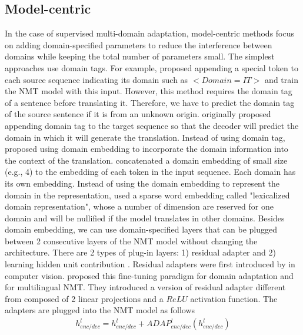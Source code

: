 \subsection{Model-centric}
In the case of supervised multi-domain adaptation, model-centric methods focus on adding domain-specified parameters to reduce the interference between domains while keeping the total number of parameters small. The simplest approaches use domain tags. For example, \citet{Kobus17domain} proposed appending a special token to each source sequence indicating its domain such as $<Domain=IT>$ and train the NMT model with this input. However, this method requires the domain tag of a sentence before translating it. Therefore, we have to predict the domain tag of the source sentence if it is from an unknown origin. \citet{Britz17effective} originally proposed appending domain tag to the target sequence so that the decoder will predict the domain in which it will generate the translation. Instead of using domain tag, \citep{Kobus17domain} proposed using domain embedding to incorporate the domain information into the context of the translation. \citet{Kobus17domain} concatenated a domain embedding of small size (e.g., 4) to the embedding of each token in the input sequence. Each domain has its own embedding. Instead of using the domain embedding to represent the domain in the representation, \citet{Pham19generic} used a sparse word embedding called "lexicalized domain representation", whose a number of dimension are reserved for one domain and will be nullified if the model translates in other domains. Besides domain embedding, we can use domain-specified layers that can be plugged between 2 consecutive layers of the NMT model without changing the architecture. There are 2 types of plug-in layers: 1) residual adapter \citep{Bapna19simple, Pham20Study} and 2) learning hidden unit contribution \citep{Vilar18learning}. Residual adapters were first introduced by \citet{Rebuffi17learning} in computer vision. \citet{Bapna19simple} proposed this fine-tuning paradigm for domain adaptation and for multilingual NMT. They introduced a version of residual adapter different from \citet{Rebuffi17learning} composed of 2 linear projections and a $ReLU$ activation function. The adapters are plugged into the NMT model as follows
\begin{equation}
\begin{array}{rcl}
h_{enc/dec}^l = h_{enc/dec}^{l} + ADAP_{enc/dec}^l(h_{enc/dec}^{l})
\end{array}
\end{equation}
